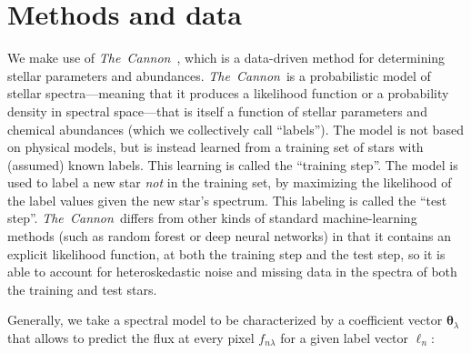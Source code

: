 \documentclass[12pt, preprint]{aastex}
\newcommand{\project}[1]{\textsl{#1}}
\newcommand{\tc}{\project{The~Cannon}}
\newcommand{\set}[1]{\bm{#1}}
\newcommand{\starlabel}{\ell}
\newcommand{\starlabelvec}{\set{\starlabel}}
\begin{document}



\section{Methods and data}

We make use of \tc\ \citep{Ness2015}, which is a data-driven method for
determining stellar parameters and abundances.
\tc\ is a probabilistic model of stellar spectra---meaning that it
produces a likelihood function or a probability density in spectral
space---that is itself a function of stellar parameters and chemical
abundances (which we collectively call ``labels'').
The model is not based on physical models, but is instead learned
from a training set of stars with (assumed) known labels.
This learning is called the ``training step''.
The model is used to label a new star \emph{not} in the training set,
by maximizing the likelihood of the label values given the new star's
spectrum.
This labeling is called the ``test step''.
\tc\ differs from other kinds of standard machine-learning methods
(such as random forest or deep neural networks) in that it contains an
explicit likelihood function, at both the training step and the test
step, so it is able to account for heteroskedastic noise and missing
data in the spectra of both the training and test stars.

Generally, we take a spectral model to be characterized by a coefficient vector $\set{\theta}_\lambda$
that allows to predict the flux at every pixel $f_{n\lambda}$ for a given label vector $\starlabelvec_n$:
\end{document}
